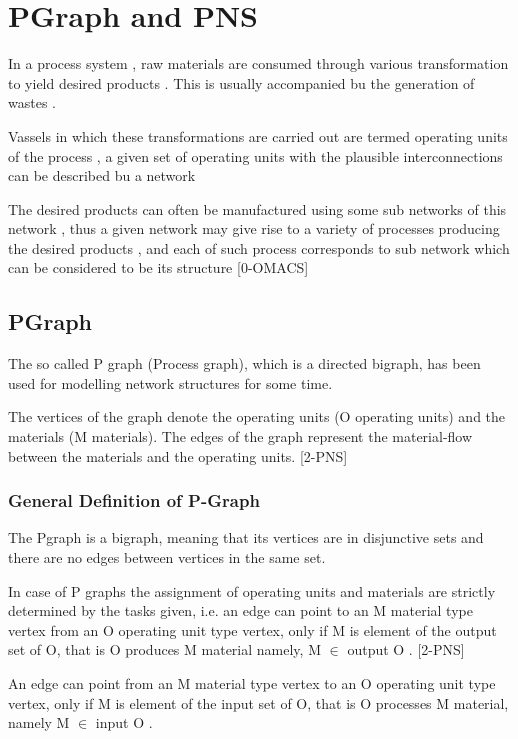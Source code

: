 
\chapter{\label{cha:pgraph}PGraph and PNS}

 
In a process system , raw materials are consumed through various transformation to yield desired products . 
This is usually accompanied bu the generation of wastes .

Vassels in which these transformations are carried out are termed operating units of the process , 
a given set of operating units with the plausible interconnections can be described bu a network 

The desired products can often be manufactured using some sub networks of this network , 
thus a given network may give rise to a variety of processes producing the desired products , 
and each of such process corresponds to sub network which can be considered  to be its structure [0-OMACS]
\section{ PGraph }


The so called P graph (Process graph), which is a directed bigraph, 
has been used for modelling network structures for some time.

The vertices of the graph denote the operating units (O   operating units) and the materials (M   materials).
The edges of the graph represent the material-flow between the materials and the operating units. [2-PNS]

\subsection{ General Definition of P-Graph }

The Pgraph is a bigraph, meaning that its vertices are in disjunctive sets 
and there are no edges between vertices in the same set.

In case of P graphs the assignment of operating units and materials are strictly 
determined by the tasks given, i.e. an edge can point to an M material type vertex 
from an O operating unit type vertex, only if M is element of the output set of O, 
that is O produces M material namely, M $\in$ output O . [2-PNS]



An edge can point from an M material type vertex to an O operating unit type vertex, 
only if M is element of the input set of O, that is O processes M material, namely M  $\in$ input O . 

